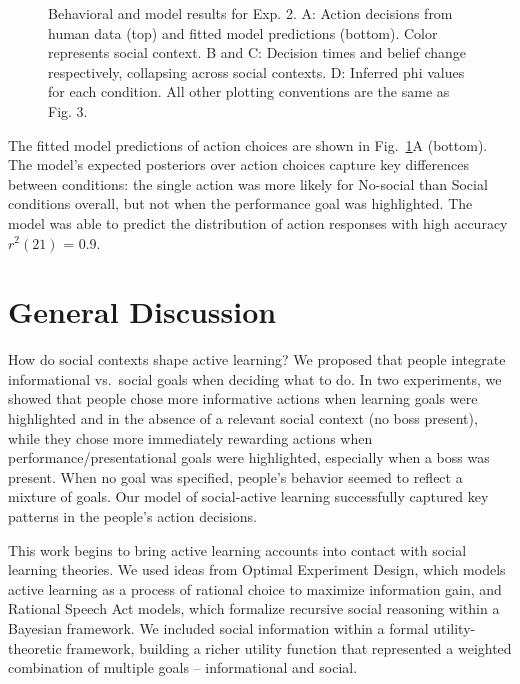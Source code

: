 \documentclass[10pt, letterpaper]{article}
\newenvironment{CodeChunk}{}{}
\begin{document}
\begin{CodeChunk}
\begin{figure}[H]
{}

\caption[Behavioral and model results for Exp]{Behavioral and model results for Exp. 2. A: Action decisions from human data (top) and fitted model predictions (bottom). Color represents social context. B and C: Decision times and belief change respectively, collapsing across social contexts. D: Inferred phi values for each condition. All other plotting conventions are the same as Fig. 3.}\label{fig:e2_results}
\end{figure}
\end{CodeChunk}

The fitted model predictions of action choices are shown in
Fig.~\ref{fig:e2_results}A (bottom). The model's expected posteriors
over action choices capture key differences between conditions: the
single action was more likely for No-social than Social conditions
overall, but not when the performance goal was highlighted. The model
was able to predict the distribution of action responses with high
accuracy \(r^2(21)\) = 0.9.

\section{General Discussion}\label{general-discussion}

How do social contexts shape active learning? We proposed that people
integrate informational vs.~social goals when deciding what to do. In
two experiments, we showed that people chose more informative actions
when learning goals were highlighted and in the absence of a relevant
social context (no boss present), while they chose more immediately
rewarding actions when performance/presentational goals were
highlighted, especially when a boss was present. When no goal was
specified, people's behavior seemed to reflect a mixture of goals. Our
model of social-active learning successfully captured key patterns in
the people's action decisions.

This work begins to bring active learning accounts into contact with
social learning theories. We used ideas from Optimal Experiment Design,
which models active learning as a process of rational choice to maximize
information gain, and Rational Speech Act models, which formalize
recursive social reasoning within a Bayesian framework. We included
social information within a formal utility-theoretic framework, building
a richer utility function that represented a weighted combination of
multiple goals -- informational and social.
\end{document}
